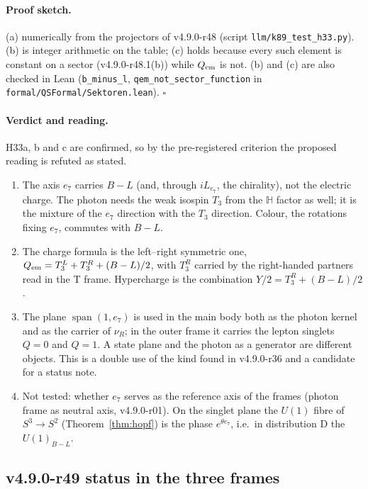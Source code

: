 \paragraph{Proof sketch.}
(a) numerically from the projectors of v4.9.0-r48 (script \texttt{llm/k89\_test\_h33.py}).  (b) is integer arithmetic on the table; (c)
holds because every such element is constant on a sector (v4.9.0-r48.1(b)) while \(Q_{\rm em}\) is not.  (b) and (c) are also checked in
Lean (\texttt{b\_minus\_l}, \texttt{qem\_not\_sector\_function} in \texttt{formal/QSFormal/Sektoren.lean}).  \(\square\)

\paragraph{Verdict and reading.}
H33a, b and c are confirmed, so by the pre-registered criterion the proposed reading is refuted as stated.
\begin{enumerate}[leftmargin=2em]
\item The axis \(e_7\) carries \(B-L\) (and, through \(iL_{e_7}\), the chirality), not the electric charge.  The photon needs the weak
isospin \(T_3\) from the \(\mathbb H\) factor as well; it is the mixture of the \(e_7\) direction with the \(T_3\) direction.  Colour, the
rotations fixing \(e_7\), commutes with \(B-L\).
\item The charge formula is the left--right symmetric one, \(Q_{\rm em}=T_3^L+T_3^R+(B-L)/2\), with \(T_3^R\) carried by the right-handed
partners read in the T frame.  Hypercharge is the combination \(Y/2=T_3^R+(B-L)/2\).
\item The plane \(\operatorname{span}(1,e_7)\) is used in the main body both as the photon kernel and as the carrier of \(\nu_R\); in the
outer frame it carries the lepton singlets \(Q=0\) and \(Q=1\).  A state plane and the photon as a generator are different objects.  This
is a double use of the kind found in v4.9.0-r36 and a candidate for a status note.
\item Not tested: whether \(e_7\) serves as the reference axis of the frames (photon frame as neutral axis, v4.9.0-r01).  On the singlet
plane the \(U(1)\) fibre of \(S^3\to S^2\) (Theorem~\ref{thm:hopf}) is the phase \(e^{\theta e_7}\), i.e.\ in distribution D the
\(U(1)_{B-L}\).
\end{enumerate}

\subsection*{v4.9.0-r49 status in the three frames}
\label{subsec:v490-r49-frames}

